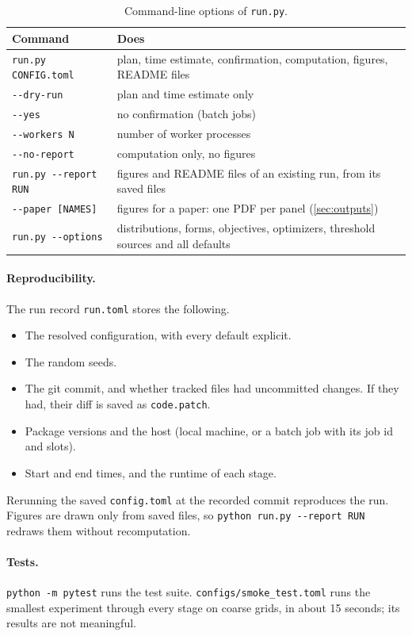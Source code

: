 \documentclass[11pt]{article}
\newcommand{\code}[1]{\texttt{#1}}
\begin{document}
\begin{table}[ht]
\centering\small
\begin{tabularx}{\linewidth}{@{}l L@{}}
\toprule
Command & Does \\
\midrule
\code{run.py CONFIG.toml} & plan, time estimate, confirmation, computation, figures, README files \\
\quad\code{-{}-dry-run} & plan and time estimate only \\
\quad\code{-{}-yes} & no confirmation (batch jobs) \\
\quad\code{-{}-workers N} & number of worker processes \\
\quad\code{-{}-no-report} & computation only, no figures \\
\code{run.py -{}-report RUN} & figures and README files of an existing run, from its saved files \\
\quad\code{-{}-paper [NAMES]} & figures for a paper: one PDF per panel (\cref{sec:outputs}) \\
\code{run.py -{}-options} & distributions, forms, objectives, optimizers, threshold sources and all defaults \\
\bottomrule
\end{tabularx}
\caption{Command-line options of \code{run.py}.}
\label{tab:cli}
\end{table}

\paragraph{Reproducibility.} The run record \code{run.toml} stores the following.
\begin{itemize}
    \item The resolved configuration, with every default explicit.
    \item The random seeds.
    \item The git commit, and whether tracked files had uncommitted changes. If they had, their diff is saved as \code{code.patch}.
    \item Package versions and the host (local machine, or a batch job with its job id and slots).
    \item Start and end times, and the runtime of each stage.
\end{itemize}
Rerunning the saved \code{config.toml} at the recorded commit reproduces the run. Figures are drawn only from saved files, so \code{python run.py -{}-report RUN} redraws them without recomputation.

\paragraph{Tests.} \code{python -m pytest} runs the test suite. \code{configs/smoke\_test.toml} runs the smallest experiment through every stage on coarse grids, in about 15 seconds; its results are not meaningful.
\end{document}
